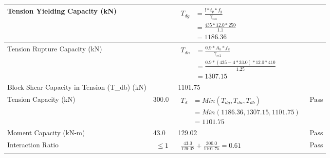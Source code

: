 \documentclass{article}%
\begin{document}
\begin{longtable}{|p{4cm}|p{5cm}|p{5.5cm}|p{1.5cm}|}
\hline%
Tension Yielding Capacity (kN)&&$\begin{aligned} T_{dg} &= \frac{l*t_p*f_y}{\gamma_{mo}}\\ &=\frac{435*12.0*250}{1.1}\\ &=1186.36\end{aligned}$&\\%
\hline%
Tension Rupture Capacity (kN)&&$\begin{aligned} T_{dn} &= \frac{0.9*A_{n}*f_u}{\gamma_{m1}}\\ &=\frac{0.9*(435-4*33.0)*12.0*410}{1.25}\\ &=1307.15\end{aligned}$&\\%
\hline%
Block Shear Capacity in Tension (T\_db) (kN)&&1101.75&\\%
\hline%
Tension Capacity (kN)&300.0&$\begin{aligned} T_d &= Min(T_{dg},T_{dn},T_{db})\\ &= Min(1186.36,1307.15,1101.75)\\ &=1101.75\end{aligned}$&Pass\\%
\hline%
Moment Capacity (kN{-}m)&43.0&129.02&Pass\\%
\hline%
Interaction Ratio&$\begin{aligned} \leq1\end{aligned}$&$\begin{aligned} \frac{43.0}{129.02}+\frac{300.0}{1101.75}=0.61\end{aligned}$&Pass\\%
\hline%
\end{longtable}

%
\newpage%
\end{document}
